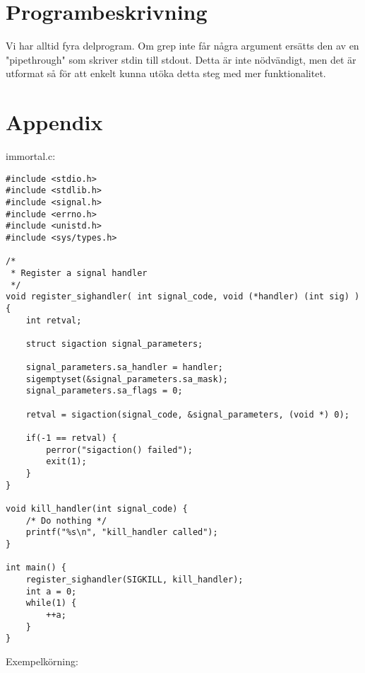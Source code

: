 \documentclass[paper=a4, fontsize=11pt]{scrartcl} %
\numberwithin{equation}{section} %
\numberwithin{figure}{section} %
\numberwithin{table}{section} %
\begin{document}
\section{Programbeskrivning}

Vi har alltid fyra delprogram. Om grep inte får några argument ersätts den av 
en "pipethrough" som skriver stdin till stdout. Detta är inte nödvändigt, men
det är utformat så för att enkelt kunna utöka detta steg med mer funktionalitet.


\newpage
\section*{Appendix}
immortal.c:\\

\begin{verbatim}
#include <stdio.h>
#include <stdlib.h>
#include <signal.h>
#include <errno.h>
#include <unistd.h>
#include <sys/types.h>

/*
 * Register a signal handler
 */
void register_sighandler( int signal_code, void (*handler) (int sig) )  {
    int retval;

    struct sigaction signal_parameters;

    signal_parameters.sa_handler = handler;
    sigemptyset(&signal_parameters.sa_mask);
    signal_parameters.sa_flags = 0;

    retval = sigaction(signal_code, &signal_parameters, (void *) 0);

    if(-1 == retval) {
        perror("sigaction() failed");
        exit(1);
    }
}

void kill_handler(int signal_code) {
    /* Do nothing */
    printf("%s\n", "kill_handler called");
}

int main() {
    register_sighandler(SIGKILL, kill_handler);
    int a = 0;
    while(1) {
        ++a;
    }
}
\end{verbatim}
\newpage


Exempelkörning:\\
\end{document}
